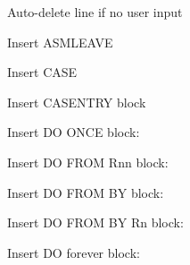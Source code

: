 \documentclass[11pt]{article}
\begin{document}
\begin{description}
\item[{}] Auto-delete line if no user input
\item[{}] Insert ASMLEAVE

\begin{pfxexample}
\end{pfxexample}
\item[{}] Insert CASE

\begin{pfxexample}
\end{pfxexample}
\item[{}] Insert CASENTRY block

\begin{pfxexample}
\end{pfxexample}
\item[{}] Insert DO ONCE block:

\begin{pfxexample}
\end{pfxexample}
\item[{}] Insert DO FROM Rnn block:

\begin{pfxexample}
\end{pfxexample}
\item[{}] Insert DO FROM BY block:

\begin{pfxexample}
\end{pfxexample}
\item[{}] Insert DO FROM BY Rn block:

\begin{pfxexample}
\end{pfxexample}
\item[{}] Insert DO forever block:


\end{description}
\end{document}
